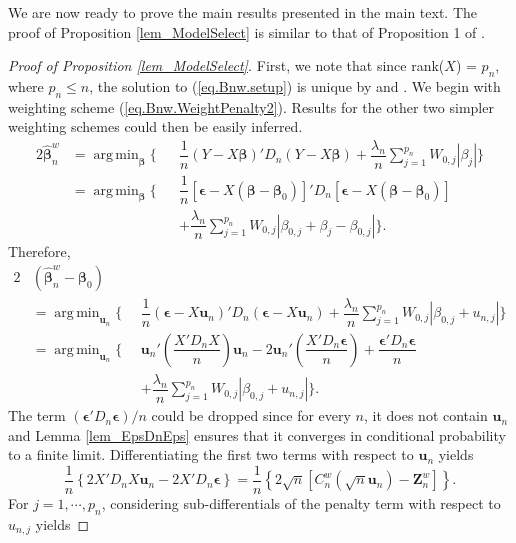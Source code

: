 \documentclass[ejs,authoryear,linksfromyear]{imsart}
\DeclareMathOperator*{\argmin}{arg\,min} %
\newcommand{\bnw}{\widehat{\bm{\beta}}_n^w} %
\numberwithin{equation}{section}
\theoremstyle{plain}
\begin{document}
We are now ready to prove the main results presented in the main text. The proof of Proposition \ref{lem_ModelSelect} is similar to that of Proposition 1 of \citet{BinYu}.

\begin{proof}[Proof of Proposition \ref{lem_ModelSelect}]
	First, we note that since rank($X$) = $p_n$, where $p_n \leq n$, the solution to (\ref{eq.Bnw.setup}) is unique by \citet{Osborne2000} and \citet{LassoUnique}. 
	We begin with weighting scheme (\ref{eq.Bnw.WeightPenalty2}).  Results for the  other  two  simpler  weighting  schemes  could  then  be easily inferred.   
	 \begin{alignat*}{2}
	 \bnw &= \argmin_{\bm{\beta}}
	 \Bigg\{
	 &&\dfrac{1}{n} (Y - X \bm{\beta})' D_n (Y - X \bm{\beta})  
	 + \dfrac{\lambda_n}{n} 
	 \sum_{j=1}^{p_n} W_{0,j} |\beta_{j}|
	 \Bigg\} \\
	 &= \argmin_{\bm{\beta}}
	 \Bigg\{
	 &&\dfrac{1}{n} 
	 [\bm{\epsilon} - X (\bm{\beta} - \bm{\beta}_0)]' 
	 D_n 
	 [\bm{\epsilon} - X (\bm{\beta} - \bm{\beta}_0)] \\
	 & &&+ \dfrac{\lambda_n}{n} 
	 \sum_{j=1}^{p_n} W_{0,j} | \beta_{0,j} + \beta_{j} - \beta_{0,j} |
	 \Bigg\}.  
	 \end{alignat*}
	 Therefore, 
	 \begin{alignat*}{2}
	 &(\bnw - \bm{\beta}_0) &&\\
	 &= \argmin_{\bm{u}_n}
	 \Bigg\{
	 &&\dfrac{1}{n} (\bm{\epsilon} - X \bm{u}_n)' D_n (\bm{\epsilon} - X \bm{u}_n)
	 + \dfrac{\lambda_n}{n} 
	 \sum_{j=1}^{p_n} W_{0,j} | \beta_{0,j} + u_{n,j} |
	 \Bigg\} \\
	 &= \argmin_{\bm{u}_n}
	 \Bigg\{
	 &&\bm{u}_n' \left( \dfrac{X' D_n X}{n} \right) \bm{u}_n
	 -2 \bm{u}_n' \left( \dfrac{X' D_n \bm{\epsilon}}{n} \right) 
	 + \dfrac{\bm{\epsilon}' D_n \bm{\epsilon}}{n} \\
	 & &&+ \dfrac{\lambda_n}{n} 
	 \sum_{j=1}^{p_n} W_{0,j} | \beta_{0,j} + u_{n,j} |
	 \Bigg\}. 
	 \end{alignat*}
	 The term $(\bm{\epsilon}' D_n \bm{\epsilon})/n$ could be dropped since for every $n$, it does not contain $\bm{u}_n$ and Lemma \ref{lem_EpsDnEps} ensures that it converges in conditional probability to a finite limit. Differentiating the first two terms with respect to $\bm{u}_n$ yields
	 $$
	 \dfrac{1}{n} \left\{ 2 X' D_n X \bm{u}_n - 2 X' D_n \bm{\epsilon} \right\}
	 = \dfrac{1}{n} \left\{ 2 \sqrt{n} 
	 \left[
	 C_n^w 
	 \left( \sqrt{n} \bm{u}_n \right) 
	 - 		\bm{Z}_n^w
	 \right] \right\}. 
	 $$
	 For $j = 1, \cdots, p_n$, considering sub-differentials of the penalty term with respect to $u_{n,j}$ yields

\end{proof}
\end{document}
